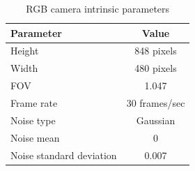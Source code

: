 \begin{table}[htp]
    \centering
    \begin{tabular}{lc}
    \toprule
    Parameter&                  Value\\
    \midrule
    Height&                     848 pixels\\
    Width&                      480 pixels\\
    FOV&                        1.047\\
    Frame rate&                 30 frames/sec\\
    Noise type&                 Gaussian\\
    Noise mean&                 0\\
    Noise standard deviation&   0.007\\
    \bottomrule
    \end{tabular}
    \caption{RGB camera intrinsic parameters}
    \label{tab:camera_params}
\end{table}


